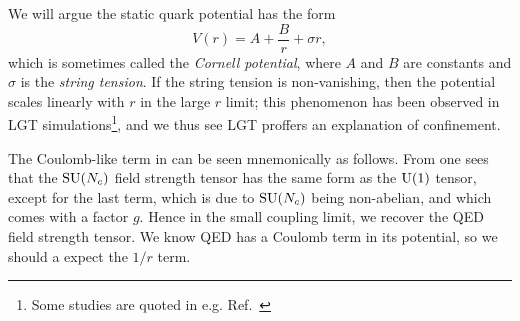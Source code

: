 We will argue the static quark potential has the form
\begin{equation}\label{eq:cornellpotential}
  V(r)=A+\frac{B}{r}+\sigma r,
\end{equation}
which is sometimes called the {\it Cornell potential},
where $A$ and $B$ are constants and
$\sigma$ is the {\it string tension}. 
If the string tension is non-vanishing, then the potential scales linearly 
with $r$ in the large $r$ limit; 
this phenomenon has been observed in LGT 
simulations\footnote{Some studies are quoted in e.g.
Ref.~\cite{montvay_quantum_1994}},
and we thus see LGT proffers an explanation of confinement.


The Coulomb-like term in  can be seen
mnemonically as follows. From 
one sees that the $\operatorname{SU}(N_c)$ field strength tensor has the same form
as the $\operatorname{U}(1)$ tensor, except for the last term, which is due to
$\operatorname{SU}(N_c)$ being non-abelian, and which comes with a factor $g$.
Hence in the small coupling limit, we recover the QED field
strength tensor. We know QED has a Coulomb term in its potential,
so we should a expect the $1/r$ term.


